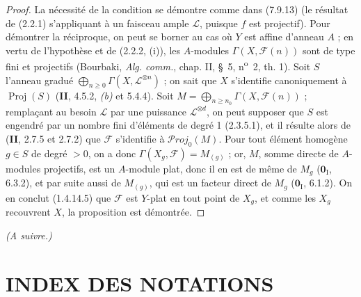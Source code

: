 \begin{proof}
La nécessité de la condition se démontre comme dans (7.9.13) (le résultat de
(2.2.1) s'appliquant à un faisceau ample $\mathscr L$, puisque $f$ est
projectif). Pour démontrer la réciproque, on peut se borner au cas où $Y$ est
affine d'anneau $A$ ; en vertu de l'hypothèse et de (2.2.2, (i)), les
$A$-modules $\Gamma(X,\mathscr F(n))$ sont de type fini et projectifs (Bourbaki,
\emph{Alg. comm.}, chap. II, \S~5, n\textsuperscript{o}~2, th. 1). Soit $S$
l'anneau gradué $\bigoplus_{n\geq0}\Gamma(X,\mathscr L^{\otimes n})$ ;
on sait que $X$ s'identifie canoniquement à $\operatorname{Proj}(S)$ (\textbf{II},
4.5.2, \emph{(b)} et 5.4.4). Soit
$M=\bigoplus_{n\geq n_0}\Gamma(X,\mathscr F(n))$ ;
remplaçant au besoin $\mathscr L$ par une puissance $\mathscr L^{\otimes d}$,
on peut supposer que $S$ est engendré par un nombre fini d'éléments de degré 1
(2.3.5.1), et il résulte alors de (\textbf{II}, 2.7.5 et 2.7.2) que $\mathscr F$
s'identifie à $\mathscr P\!roj_0(M)$. Pour tout élément homogène $g\in S$ de
degré $>0$, on a donc $\Gamma(X_g,\mathscr F)=M_{(g)}$ ; or, $M$, somme directe
de $A$-modules projectifs, est un $A$-module plat, donc il en est de même de
$M_g$ ($\mathbf{0}_{\mathrm I}$, 6.3.2), et par suite aussi de $M_{(g)}$, qui est un
facteur direct de $M_g$ ($\mathbf{0}_{\mathrm I}$, 6.1.2). On en conclut (1.4.14.5) que
$\mathscr F$ est $Y$-plat en tout point de $X_g$, et comme les $X_g$ recouvrent
$X$, la proposition est démontrée.
\end{proof}

\bigskip
\noindent\emph{(A suivre.)}

\clearpage
{}
\section*{INDEX DES NOTATIONS}

